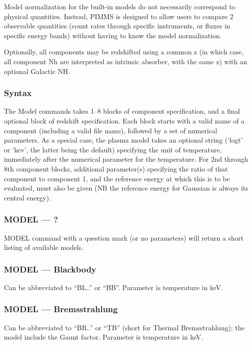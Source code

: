 Model normalization for the built-in models do not necessarily correspond to
physical quantities.  Instead, PIMMS is designed to allow users to compare 2
observable quantities (count rates through specific instruments, or fluxes in
specific energy bands) without having to know the model normalization.

Optionally,  all components may be redshifted using a common z (in which case,
all component Nh are interpreted as intrinsic absorber, with the same z)  with
an optional Galactic NH.

\subsubsection*{Syntax}

The Model commands takes 1--8 blocks of component specification, and a final
optional block of redshift specification.  Each block starts with a valid
name of a component (including a valid file name), followed by a set of
numerical parameters.  As a special case, the plasma model takes an
optional string (`logt' or `kev', the latter being the default) specifying
the unit of temperature, immediately after the numerical parameter for the
temperature.  For 2nd through 8th
component blocks, additional parameter(s) specifying the ratio of that
component to component 1, and the reference energy at which this is to
be evaluated, must also be given (NB the reference energy for Gaussian
is always its central energy).

\subsubsection*{MODEL --- ?}

MODEL command  with a question mark  (or no  parameters) will return a short
listing of available models.

\subsubsection*{MODEL --- Blackbody}

Can be abbreviated to ``BL..'' or ``BB''.  Parameter is temperature in keV.

\subsubsection*{MODEL --- Bremsstrahlung}

Can be abbreviated to ``BR..'' or ``TB'' (short for Thermal Bremsstrahlung); the
model include the Gaunt factor.  Parameter is temperature in keV.

